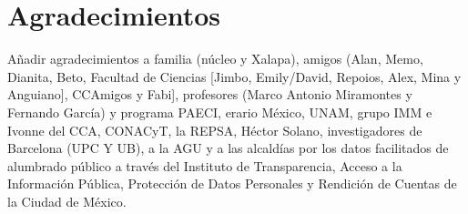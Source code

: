\chapter{Agradecimientos}


Añadir agradecimientos a familia (núcleo y Xalapa), amigos (Alan, Memo, Dianita, Beto, Facultad de Ciencias [Jimbo, Emily/David, Repoios, Alex, Mina y Anguiano], CCAmigos y Fabi], profesores (Marco Antonio Miramontes y Fernando García) y programa PAECI, erario México, UNAM, grupo IMM e Ivonne del CCA, CONACyT, la REPSA, Héctor Solano, investigadores de Barcelona (UPC Y UB), a la AGU y a las alcaldías por los datos facilitados de alumbrado público a través del Instituto de Transparencia, Acceso a la Información Pública, Protección de Datos Personales y Rendición de Cuentas de la Ciudad de México.








